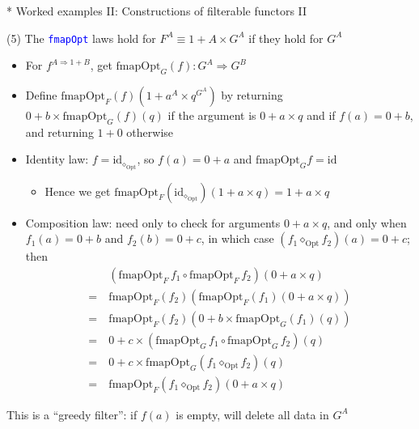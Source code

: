 \documentclass[english]{beamer}
\begin{document}
\begin{frame}{{*} Worked examples II: Constructions of filterable functors II}

(5) The \texttt{\textcolor{blue}{\footnotesize{}fmapOpt}} laws hold
for $F^{A}\equiv1+A\times G^{A}$ if they hold for $G^{A}$
\begin{itemize}
\item For $f^{A\Rightarrow1+B}$, get {\footnotesize{}$\text{fmapOpt}_{G}(f):G^{A}\Rightarrow G^{B}$}{\footnotesize \par}
\item {\footnotesize{}Define $\text{fmapOpt}_{F}(f)(1+a^{A}\times q^{G^{A}})$
by returning $0+b\times\text{fmapOpt}_{G}(f)(q)$ if the argument
is $0+a\times q$ and if $f(a)=0+b$, and returning $1+0$ otherwise}{\footnotesize \par}
\item Identity law: {\footnotesize{}$f=\text{id}_{\diamond_{\text{Opt}}}$,
so $f(a)=0+a$ and $\text{fmapOpt}_{G}f=\text{id}$}{\footnotesize \par}
\begin{itemize}
\item Hence we get{\footnotesize{} $\text{fmapOpt}_{F}(\text{id}_{\diamond_{\text{Opt}}})(1+a\times q)=1+a\times q$}{\footnotesize \par}
\end{itemize}
\item Composition law: {\footnotesize{}need only to check for arguments
$0+a\times q$, and only when $f_{1}(a)=0+b$ and $f_{2}(b)=0+c$,
in which case $(f_{1}\diamond_{\text{Opt}}f_{2})(a)=0+c$; then 
\begin{align*}
 & (\text{fmapOpt}_{F}\,f_{1}\circ\text{fmapOpt}_{F}\,f_{2})(0+a\times q)\\
=\  & \text{fmapOpt}_{F}(f_{2})\left(\text{fmapOpt}_{F}(f_{1})(0+a\times q)\right)\\
=\  & \text{fmapOpt}_{F}(f_{2})\left(0+b\times\text{fmapOpt}_{G}(f_{1})(q)\right)\\
=\  & 0+c\times(\text{fmapOpt}_{G}\,f_{1}\circ\text{fmapOpt}_{G}\,f_{2})(q)\\
=\  & 0+c\times\text{fmapOpt}_{G}(f_{1}\diamond_{\text{Opt}}f_{2})(q)\\
=\  & \text{fmapOpt}_{F}(f_{1}\diamond_{\text{Opt}}f_{2})(0+a\times q)
\end{align*}
}{\footnotesize \par}
\end{itemize}
This is a ``greedy filter'': if $f(a)$ is empty, will delete all
data in $G^{A}$
\end{frame}
\end{document}
